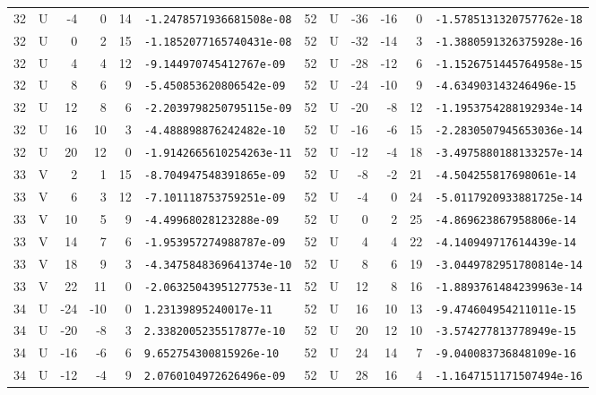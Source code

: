 \begin{longtable}{rcrrrl|rcrrrl}
32 & U & -4 & 0 & 14 & \texttt{-1.2478571936681508e-08} & 52 & U & -36 & -16 & 0 & \texttt{-1.5785131320757762e-18}\\
32 & U & 0 & 2 & 15 & \texttt{-1.1852077165740431e-08} & 52 & U & -32 & -14 & 3 & \texttt{-1.3880591326375928e-16}\\
32 & U & 4 & 4 & 12 & \texttt{-9.144970745412767e-09} & 52 & U & -28 & -12 & 6 & \texttt{-1.1526751445764958e-15}\\
32 & U & 8 & 6 & 9 & \texttt{-5.450853620806542e-09} & 52 & U & -24 & -10 & 9 & \texttt{-4.634903143246496e-15}\\
32 & U & 12 & 8 & 6 & \texttt{-2.2039798250795115e-09} & 52 & U & -20 & -8 & 12 & \texttt{-1.1953754288192934e-14}\\
32 & U & 16 & 10 & 3 & \texttt{-4.488898876242482e-10} & 52 & U & -16 & -6 & 15 & \texttt{-2.2830507945653036e-14}\\
32 & U & 20 & 12 & 0 & \texttt{-1.9142665610254263e-11} & 52 & U & -12 & -4 & 18 & \texttt{-3.4975880188133257e-14}\\
33 & V & 2 & 1 & 15 & \texttt{-8.704947548391865e-09} & 52 & U & -8 & -2 & 21 & \texttt{-4.504255817698061e-14}\\
33 & V & 6 & 3 & 12 & \texttt{-7.101118753759251e-09} & 52 & U & -4 & 0 & 24 & \texttt{-5.0117920933881725e-14}\\
33 & V & 10 & 5 & 9 & \texttt{-4.49968028123288e-09} & 52 & U & 0 & 2 & 25 & \texttt{-4.869623867958806e-14}\\
33 & V & 14 & 7 & 6 & \texttt{-1.953957274988787e-09} & 52 & U & 4 & 4 & 22 & \texttt{-4.140949717614439e-14}\\
33 & V & 18 & 9 & 3 & \texttt{-4.3475848369641374e-10} & 52 & U & 8 & 6 & 19 & \texttt{-3.0449782951780814e-14}\\
33 & V & 22 & 11 & 0 & \texttt{-2.0632504395127753e-11} & 52 & U & 12 & 8 & 16 & \texttt{-1.8893761484239963e-14}\\
34 & U & -24 & -10 & 0 & \texttt{1.23139895240017e-11} & 52 & U & 16 & 10 & 13 & \texttt{-9.474604954211011e-15}\\
34 & U & -20 & -8 & 3 & \texttt{2.3382005235517877e-10} & 52 & U & 20 & 12 & 10 & \texttt{-3.574277813778949e-15}\\
34 & U & -16 & -6 & 6 & \texttt{9.652754300815926e-10} & 52 & U & 24 & 14 & 7 & \texttt{-9.040083736848109e-16}\\
34 & U & -12 & -4 & 9 & \texttt{2.0760104972626496e-09} & 52 & U & 28 & 16 & 4 & \texttt{-1.1647151171507494e-16}\\

\end{longtable}

